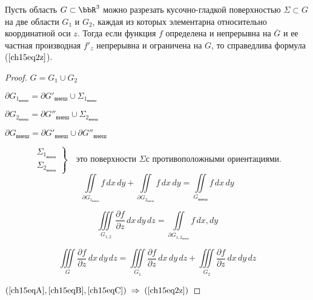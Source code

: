 \begin{lemm}
Пусть область $G \subset \bbR^3$ можно разрезать кусочно-гладкой поверхностью $\Sigma \subset G$ на две области $G_1$ и $G_2$, каждая из которых элементарна относительно координатной оси $z$. Тогда если функция $f$ определена и непрерывна на $\overline{G}$ и ее частная производная $f'_z$ непрерывна и ограничена на $G$, то справедлива формула ($\ref{ch15eq2z}$).
\end{lemm}

\begin{proof}
$G = G_1 \cup G_2$

$\partial G_{1_{\textit{внеш}}} = \partial G'_{\textit{внеш}} \cup \Sigma_{1_{\textit{внеш}}}$

$\partial G_{2_{\textit{внеш}}} = \partial G''_{\textit{внеш}} \cup \Sigma_{2_{\textit{внеш}}}$

$\partial G_{\textit{внеш}} = \partial G'_{\textit{внеш}} \cup \partial G''_{\textit{внеш}}$

\begin{equation*}
\left.\begin{aligned}
\Sigma_{1_{\textit{внеш}}} \\ 
 \Sigma_{2_{\textit{внеш}}}
\end{aligned} \right\} \quad  \textit{это поверхности } \Sigma \textit{с противоположными ориентациями}.
\end{equation*}
\begin{equation} \label{ch15eqA}
\iint\limits_{\partial G_{1_{\textit{внеш}}}} f \,dx\,dy + \iint\limits_{\partial G_{2_{\textit{внеш}}}} f \,dx\,dy = \iint\limits_{G_{\textit{внеш}}} f\,dx\,dy
\end{equation}

\begin{equation} \label{ch15eqB}
\iiint\limits_{G_{1,2}} \frac{\partial f}{\partial z}\,dx\,dy\,dz = \iint\limits_{\partial G_{1,2_{\textit{внеш}}}} f \,dx,dy
\end{equation}

\begin{equation} \label{ch15eqC}
\iiint\limits_{G} \frac{\partial f}{\partial z}\,dx\,dy\,dz = \iiint\limits_{G_1} \frac{\partial f}{\partial z}\,dx\,dy\,dz + \iiint\limits_{G_2} \frac{\partial f}{\partial z}\,dx\,dy\,dz 
\end{equation}

$(\ref{ch15eqA}, \ref{ch15eqB}, \ref{ch15eqC}) \; \Rightarrow \; (\ref{ch15eq2z})$
\end{proof}

